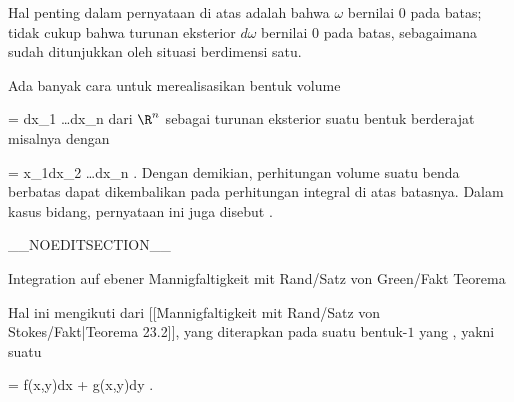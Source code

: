 Hal penting dalam pernyataan di atas adalah bahwa $\omega$ bernilai $0$ pada batas; tidak cukup bahwa turunan eksterior $d\omega$ bernilai $0$ pada batas, sebagaimana sudah ditunjukkan oleh situasi berdimensi satu.

Ada banyak cara untuk merealisasikan bentuk volume

\mavergleichskette
{\vergleichskette
{ \tau
}
{ = }{ dx_1 \wedge \ldots \wedge dx_n
}
{  }{
}
{    }{
}
{   }{
}
}
{}{}{}
dari $\R^n$ sebagai turunan eksterior suatu bentuk berderajat
 misalnya dengan

\mavergleichskette
{\vergleichskette
{  \omega
}
{ = }{ x_1dx_2 \wedge \ldots \wedge dx_n
}
{  }{
}
{    }{
}
{   }{
}
}
{}{}{.}
Dengan demikian, perhitungan volume suatu benda berbatas dapat dikembalikan pada perhitungan integral di atas batasnya. Dalam kasus bidang, pernyataan ini juga disebut  {.}

__NOEDITSECTION__

{Integration auf ebener Mannigfaltigkeit mit Rand/Satz von Green/Fakt}
{Teorema}
{}
{

\faktzusatz {}
\faktzusatz {}

}
{

Hal ini mengikuti dari
[[Mannigfaltigkeit mit Rand/Satz von Stokes/Fakt|Teorema 23.2]],
yang diterapkan pada suatu bentuk-$1$ yang
,
yakni suatu

\mavergleichskette
{\vergleichskette
{ \omega
}
{ = }{ f(x,y)dx + g(x,y)dy
}
{  }{
}
{    }{
}
{   }{
}
}
{}{}{.}

}

